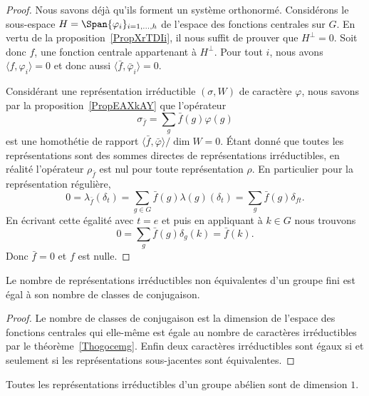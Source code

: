 \begin{proof}
	Nous savons déjà qu'ils forment un système orthonormé. Considérons le sous-espace \( H=\Span\{ \varphi_i \}_{i=1,\ldots, h}\) de l'espace des fonctions centrales sur \( G\). En vertu de la proposition~\ref{PropXrTDIi}, il nous suffit de prouver que \( H^{\perp}=0\). Soit donc \( f\), une fonction centrale appartenant à \( H^{\perp}\). Pour tout \( i\), nous avons \( \langle f, \varphi_i\rangle =0\) et donc aussi \( \langle \bar f, \bar\varphi_i\rangle =0\).

	Considérant une représentation irréductible \( (\sigma,W)\) de caractère \( \varphi\), nous savons par la proposition~\ref{PropEAXkAY} que l'opérateur
	\begin{equation}
		\sigma_{\bar f}=\sum_g\bar f(g)\varphi(g)
	\end{equation}
	est une homothétie de rapport \( \langle \bar f, \bar\varphi\rangle/\dim W=0\). Étant donné que toutes les représentations sont des sommes directes de représentations irréductibles, en réalité l'opérateur \( \rho_{\bar f}\) est nul pour toute représentation \( \rho\). En particulier pour la représentation régulière,
	\begin{equation}
		0=\lambda_{\bar f}(\delta_t)=\sum_{g\in G}\bar f(g)\lambda(g)(\delta_t)=\sum_g\bar f(g)\delta_{ft}.
	\end{equation}
	En écrivant cette égalité avec \( t=e\) et puis en appliquant à \( k\in G\) nous trouvons
	\begin{equation}
		0=\sum_g\bar f(g)\delta_g(k)=\bar f(k).
	\end{equation}
	Donc \( \bar f=0\) et \( f\) est nulle.
\end{proof}

\begin{corollary}   \label{CorbdcVNC}
	Le nombre de représentations irréductibles non équivalentes d'un groupe fini est égal à son nombre de classes de conjugaison.
\end{corollary}

\begin{proof}
	Le nombre de classes de conjugaison est la dimension de l'espace des fonctions centrales qui elle-même est égale au nombre de caractères irréductibles par le théorème~\ref{Thogocemg}. Enfin deux caractères irréductibles sont égaux si et seulement si les représentations sous-jacentes sont équivalentes.
\end{proof}

\begin{corollary}       \label{CORooWAGXooByrelO}
	Toutes les représentations irréductibles d'un groupe abélien sont de dimension \( 1\).
\end{corollary}

